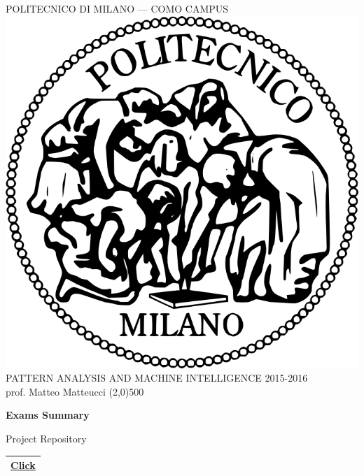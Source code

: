 \documentclass[a4paper,12pt,titlepage]{article} %
\begin{document}
	\begin{titlepage}
		
		\begin{center}
			POLITECNICO DI MILANO --- COMO CAMPUS\\
			\vspace{10pt}
			\includegraphics[scale=0.1]{logo-polimi.png}\\
			\vspace{10pt}
			PATTERN ANALYSIS AND MACHINE INTELLIGENCE 2015-2016\\
			prof. Matteo Matteucci	
			\line(2,0){500}
		\end{center}
		
		\vspace{60pt}	
		\begin{center}
			{\Huge \textbf{Exams Summary}}\\
		\end{center}
		
		\vspace{60pt}
		
		\begin{center}
			{\large Project Repository}
		\end{center}
		\begin{tabularx}{\textwidth}{|X|}
			\hline
			\href{https://github.com/attillax/PAMI-2015}{Click}\\
			\hline
		\end{tabularx}
		

\end{titlepage}
\end{document}
